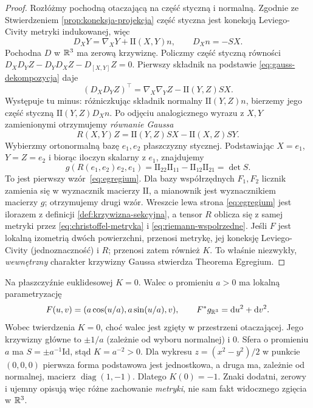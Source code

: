 \begin{proof}
Rozłóżmy pochodną otaczającą na część styczną
i normalną. Zgodnie ze Stwierdzeniem
\ref{prop:koneksja-projekcja} część styczna jest
koneksją Leviego-Civity metryki indukowanej, więc
\begin{equation}\label{eq:gauss-dekompozycja}
 D_XY=\nabla_XY+\mathrm{II}(X,Y)n,
 \qquad D_Xn=-S X.
\end{equation}
Pochodna $D$ w $\mathbb{R}^3$ ma zerową krzywiznę.
Policzmy część styczną równości
$D_XD_YZ-D_YD_XZ-D_{[X,Y]}Z=0$.
Pierwszy składnik na podstawie
\eqref{eq:gauss-dekompozycja} daje
\[
 (D_XD_YZ)^\top
 =\nabla_X\nabla_YZ-\mathrm{II}(Y,Z)SX.
\]
Występuje tu minus: różniczkując składnik
normalny $\mathrm{II}(Y,Z)n$, bierzemy jego część
styczną $\mathrm{II}(Y,Z)D_Xn$.
Po odjęciu analogicznego wyrazu z $X,Y$
zamienionymi otrzymujemy \emph{równanie Gaussa}
\begin{equation}\label{eq:gauss-rownanie}
 R(X,Y)Z=\mathrm{II}(Y,Z)SX
                       -\mathrm{II}(X,Z)SY.
\end{equation}
Wybierzmy ortonormalną bazę $e_1,e_2$ płaszczyzny
stycznej. Podstawiając $X=e_1$, $Y=Z=e_2$
i biorąc iloczyn skalarny z $e_1$, znajdujemy
\[
 g(R(e_1,e_2)e_2,e_1)
 =\mathrm{II}_{22}\mathrm{II}_{11}
      -\mathrm{II}_{12}\mathrm{II}_{21}=\det S.
\]
To jest pierwszy wzór~\eqref{eq:egregium}.
Dla bazy współrzędnych $F_1,F_2$ licznik
zamienia się w wyznacznik macierzy $\mathrm{II}$,
a mianownik jest wyznacznikiem macierzy $g$;
otrzymujemy drugi wzór. Wreszcie lewa strona
\eqref{eq:egregium} jest ilorazem z definicji
\ref{def:krzywizna-sekcyjna}, a tensor $R$
oblicza się z samej metryki przez
\eqref{eq:christoffel-metryka} i
\eqref{eq:riemann-wspolrzedne}. Jeśli $F$ jest
lokalną izometrią dwóch powierzchni, przenosi
metrykę, jej koneksję Leviego-Civity (jednoznaczność)
i $R$; przenosi zatem również $K$. To właśnie
niezwykły, \emph{wewnętrzny} charakter krzywizny
Gaussa stwierdza Theorema Egregium.
\end{proof}

\begin{przyklad}
\label{prz:egregium-cztery}
Na płaszczyźnie euklidesowej $K=0$. Walec o promieniu
$a>0$ ma lokalną parametryzację
\[
 F(u,v)=(a\cos(u/a),a\sin(u/a),v),
 \qquad F^*g_{\mathbb{R}^3}=\mathrm d u^2+\mathrm d v^2.
\]
Wobec twierdzenia $K=0$, choć walec jest zgięty
w przestrzeni otaczającej. Jego krzywizny główne
to $\pm1/a$ (zależnie od wyboru normalnej) i $0$.
Sfera o promieniu $a$ ma $S=\pm a^{-1}\mathrm{Id}$,
stąd $K=a^{-2}>0$. Dla wykresu
$z=(x^2-y^2)/2$ w punkcie $(0,0,0)$ pierwsza
forma podstawowa jest jednostkowa, a druga ma,
zależnie od normalnej, macierz
$\operatorname{diag}(1,-1)$. Dlatego $K(0)=-1$.
Znaki dodatni, zerowy i ujemny opisują więc
różne zachowanie \emph{metryki}, nie sam fakt
widocznego zgięcia w $\mathbb{R}^3$.
\end{przyklad}


